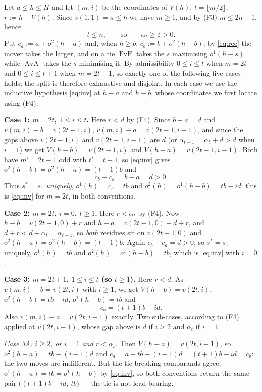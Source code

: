 \documentclass[11pt]{amsart}
\theoremstyle{definition}
\theoremstyle{remark}
\DeclareMathOperator{\FvF}{FvF}
\DeclareMathOperator{\AvA}{AvA}
\begin{document}
Let $a\le h\le H$ and let $(m,i)$ be the coordinates of $V(h)$, $t=\lfloor
m/2\rfloor$, $r:=h-V(h)$. Since $v(1,1)=a\le h$ we have $m\ge1$, and by (F3)
$m\le2n+1$, hence
\begin{equation}\label{eq:tn}
  t\le n,\qquad\text{so}\qquad \alpha_t\ge\varepsilon>0 .
\end{equation}
Put $c_a:=a+o^2(h-a)$ and, when $h\ge b$, $c_b:=b+o^2(h-b)$; by \eqref{eq:rec}
the mover takes the larger, and on a tie $\FvF$ takes the $s$ maximising
$o^1(h-s)$ while $\AvA$ takes the $s$ minimising it. By admissibility
$0\le i\le t$ when $m=2t$ and $0\le i\le t+1$ when $m=2t+1$, so exactly one of
the following five cases holds; the split is therefore exhaustive and disjoint.
In each case we use the inductive hypothesis \eqref{eq:inv} at $h-a$ and $h-b$,
whose coordinates we first locate using (F4).

\medskip
\noindent\textbf{Case 1: $m=2t$, $1\le i\le t$.}
Here $r<d$ by (F4). Since $b-a=d$ and $v(m,i)-b=v(2t-1,i)$,
$v(m,i)-a=v(2t-1,i-1)$, and since the gaps above $v(2t-1,i)$ and
$v(2t-1,i-1)$ are $d$ (or $\alpha_{t-1}=\alpha_t+d>d$ when $i=1$) we get
$V(h-b)=v(2t-1,i)$ and $V(h-a)=v(2t-1,i-1)$. Both have $m'=2t-1$ odd with
$t'=t-1$, so \eqref{eq:inv} gives $o^2(h-b)=o^2(h-a)=(t-1)b$ and
\[
  c_b-c_a=b-a=d>0 .
\]
Thus $s^*=s_1$ \emph{uniquely}, $o^1(h)=c_b=tb$ and
$o^2(h)=o^1(h-b)=tb-id$: this is \eqref{eq:inv} for $m=2t$, in both
conventions.

\medskip
\noindent\textbf{Case 2: $m=2t$, $i=0$, $t\ge1$.}
Here $r<\alpha_t$ by (F4). Now $h-b=v(2t-1,0)+r$ and
$h-a=v(2t-1,0)+d+r$, and $d+r<d+\alpha_t=\alpha_{t-1}$, so \emph{both} residues
sit on $v(2t-1,0)$ and $o^2(h-a)=o^2(h-b)=(t-1)b$. Again $c_b-c_a=d>0$, so
$s^*=s_1$ uniquely, $o^1(h)=tb$ and $o^2(h)=o^1(h-b)=tb$, which is
\eqref{eq:inv} with $i=0$.

\medskip
\noindent\textbf{Case 3: $m=2t+1$, $1\le i\le t$ \textup{(}so $t\ge1$\textup{)}.}
Here $r<d$. As $v(m,i)-b=v(2t,i)$ with $i\ge1$, we get $V(h-b)=v(2t,i)$,
$o^2(h-b)=tb-id$, $o^1(h-b)=tb$ and
\[
  c_b=(t+1)b-id .
\]
Also $v(m,i)-a=v(2t,i-1)$ exactly. Two sub-cases, according to (F4) applied at
$v(2t,i-1)$, whose gap above is $d$ if $i\ge2$ and $\alpha_t$ if $i=1$.

\emph{Case 3A: $i\ge2$, or $i=1$ and $r<\alpha_t$.} Then
$V(h-a)=v(2t,i-1)$, so $o^2(h-a)=tb-(i-1)d$ and
$c_a=a+tb-(i-1)d=(t+1)b-id=c_b$: the two moves are indifferent. But the
tie-breaking comparands agree, $o^1(h-a)=tb=o^1(h-b)$ by \eqref{eq:inv}, so
both conventions return the same pair
$\bigl((t+1)b-id,\ tb\bigr)$ --- the tie is not load-bearing.
\end{document}
